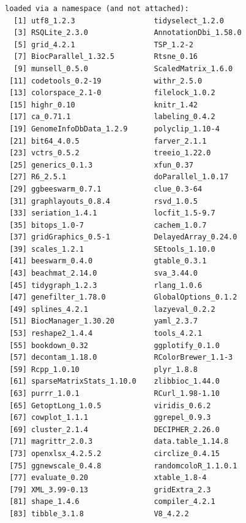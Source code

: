 \documentclass[
]{book}
\begin{document}
\begin{verbatim}
loaded via a namespace (and not attached):
  [1] utf8_1.2.3                  tidyselect_1.2.0           
  [3] RSQLite_2.3.0               AnnotationDbi_1.58.0       
  [5] grid_4.2.1                  TSP_1.2-2                  
  [7] BiocParallel_1.32.5         Rtsne_0.16                 
  [9] munsell_0.5.0               ScaledMatrix_1.6.0         
 [11] codetools_0.2-19            withr_2.5.0                
 [13] colorspace_2.1-0            filelock_1.0.2             
 [15] highr_0.10                  knitr_1.42                 
 [17] ca_0.71.1                   labeling_0.4.2             
 [19] GenomeInfoDbData_1.2.9      polyclip_1.10-4            
 [21] bit64_4.0.5                 farver_2.1.1               
 [23] vctrs_0.5.2                 treeio_1.22.0              
 [25] generics_0.1.3              xfun_0.37                  
 [27] R6_2.5.1                    doParallel_1.0.17          
 [29] ggbeeswarm_0.7.1            clue_0.3-64                
 [31] graphlayouts_0.8.4          rsvd_1.0.5                 
 [33] seriation_1.4.1             locfit_1.5-9.7             
 [35] bitops_1.0-7                cachem_1.0.7               
 [37] gridGraphics_0.5-1          DelayedArray_0.24.0        
 [39] scales_1.2.1                SEtools_1.10.0             
 [41] beeswarm_0.4.0              gtable_0.3.1               
 [43] beachmat_2.14.0             sva_3.44.0                 
 [45] tidygraph_1.2.3             rlang_1.0.6                
 [47] genefilter_1.78.0           GlobalOptions_0.1.2        
 [49] splines_4.2.1               lazyeval_0.2.2             
 [51] BiocManager_1.30.20         yaml_2.3.7                 
 [53] reshape2_1.4.4              tools_4.2.1                
 [55] bookdown_0.32               ggplotify_0.1.0            
 [57] decontam_1.18.0             RColorBrewer_1.1-3         
 [59] Rcpp_1.0.10                 plyr_1.8.8                 
 [61] sparseMatrixStats_1.10.0    zlibbioc_1.44.0            
 [63] purrr_1.0.1                 RCurl_1.98-1.10            
 [65] GetoptLong_1.0.5            viridis_0.6.2              
 [67] cowplot_1.1.1               ggrepel_0.9.3              
 [69] cluster_2.1.4               DECIPHER_2.26.0            
 [71] magrittr_2.0.3              data.table_1.14.8          
 [73] openxlsx_4.2.5.2            circlize_0.4.15            
 [75] ggnewscale_0.4.8            randomcoloR_1.1.0.1        
 [77] evaluate_0.20               xtable_1.8-4               
 [79] XML_3.99-0.13               gridExtra_2.3              
 [81] shape_1.4.6                 compiler_4.2.1             
 [83] tibble_3.1.8                V8_4.2.2                   

\end{verbatim}
\end{document}
